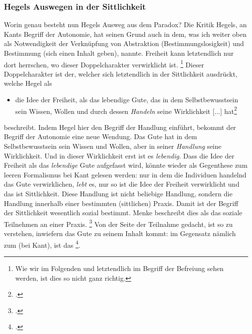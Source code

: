 \documentclass[12pt, a4paper, openany]{report}
\begin{document}
\subsubsection{Hegels Auswegen in der Sittlichkeit}
Worin genau besteht nun Hegels Ausweg aus dem Paradox?
Die Kritik Hegels, an Kants Begriff der Autonomie, hat seinen Grund auch in dem, was ich weiter oben als Notwendigkeit der Verknüpfung von Abstraktion (Bestimmungslosigkeit) und Bestimmung (sich einen Inhalt geben), nannte. 
Freiheit kann letztendlich nur dort herrschen, wo dieser Doppelcharakter verwirklicht ist.%
\footnote{
    Wie wir im Folgenden und letztendlich im Begriff der Befreiung sehen werden, ist dies so nicht ganz richtig.
}
Dieser Doppelcharakter ist der, welcher sich letztendlich in der Sittlichkeit ausdrückt, welche Hegel als 
\begin{itemize}
    \item[] die Idee der Freiheit, als das lebendige Gute, das in dem Selbstbewusstsein sein Wissen, Wollen und durch dessen \textit{Handeln} seine Wirklichkeit [...] hat\footcite[][§142, S. 161. Hervorhebung von mir]{hegel_grundlinien_2017} 
\end{itemize}
beschreibt.
Indem Hegel hier den Begriff der Handlung einführt, bekommt der Begriff der Autonomie eine neue Wendung. 
Das Gute hat in dem Selbstbewusstsein sein Wissen und Wollen, aber in seiner \emph{Handlung} seine Wirklichkeit. 
Und in dieser Wirklichkeit erst ist es \emph{lebendig}.
Dass die Idee der Freiheit als das \emph{lebendige} Gute aufgefasst wird, könnte wieder als Gegenthese zum leeren Formalismus bei Kant gelesen werden:
nur in dem die Individuen handelnd das Gute verwirklichen, \emph{lebt} es, nur so ist die Idee der Freiheit verwirklicht und das ist Sittlichkeit.
Diese Handlung ist nicht beliebige Handlung, sondern die Handlung innerhalb einer bestimmten (sittlichen) Praxis.
Damit ist der Begriff der Sittlichkeit wesentlich sozial bestimmt.
Menke beschreibt dies als das soziale Teilnehmen an einer Praxis. \footcite[Vgl.][28 ff]{menke_autonomie_2018}
Von der Seite der Teilnahme gedacht, ist so zu verstehen, inwiefern das Gute zu seinem Inhalt kommt: im Gegensatz nämlich zum  (bei Kant), ist das \footcite[][§144, S. 161.]{hegel_grundlinien_2017}.
\end{document}
